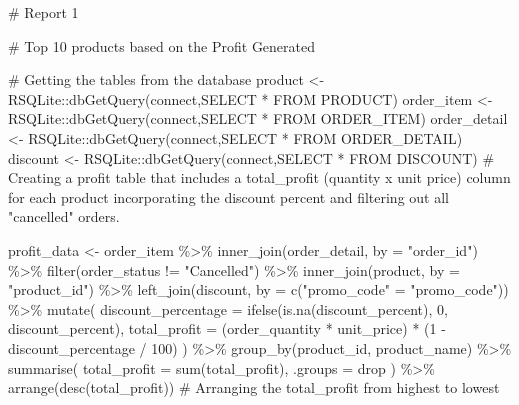\documentclass[
  letterpaper,
  DIV=11,
  numbers=noendperiod]{scrartcl}
\newenvironment{Shaded}{\begin{snugshade}}{\end{snugshade}}
\newcommand{\AttributeTok}[1]{\textcolor[rgb]{0.40,0.45,0.13}{#1}}
\newcommand{\CommentTok}[1]{\textcolor[rgb]{0.37,0.37,0.37}{#1}}
\newcommand{\DecValTok}[1]{\textcolor[rgb]{0.68,0.00,0.00}{#1}}
\newcommand{\FunctionTok}[1]{\textcolor[rgb]{0.28,0.35,0.67}{#1}}
\newcommand{\NormalTok}[1]{\textcolor[rgb]{0.00,0.23,0.31}{#1}}
\newcommand{\OtherTok}[1]{\textcolor[rgb]{0.00,0.23,0.31}{#1}}
\newcommand{\SpecialCharTok}[1]{\textcolor[rgb]{0.37,0.37,0.37}{#1}}
\newcommand{\StringTok}[1]{\textcolor[rgb]{0.13,0.47,0.30}{#1}}
\begin{document}
\begin{Shaded}
\begin{Highlighting}[]
\CommentTok{\# Report 1}

\CommentTok{\# Top 10 products based on the Profit Generated}

\CommentTok{\# Getting the tables from the database}
\NormalTok{product }\OtherTok{\textless{}{-}}\NormalTok{ RSQLite}\SpecialCharTok{::}\FunctionTok{dbGetQuery}\NormalTok{(connect,}\StringTok{\textquotesingle{}SELECT * FROM PRODUCT\textquotesingle{}}\NormalTok{)}
\NormalTok{order\_item }\OtherTok{\textless{}{-}}\NormalTok{ RSQLite}\SpecialCharTok{::}\FunctionTok{dbGetQuery}\NormalTok{(connect,}\StringTok{\textquotesingle{}SELECT * FROM ORDER\_ITEM\textquotesingle{}}\NormalTok{)}
\NormalTok{order\_detail }\OtherTok{\textless{}{-}}\NormalTok{ RSQLite}\SpecialCharTok{::}\FunctionTok{dbGetQuery}\NormalTok{(connect,}\StringTok{\textquotesingle{}SELECT * FROM ORDER\_DETAIL\textquotesingle{}}\NormalTok{)}
\NormalTok{discount }\OtherTok{\textless{}{-}}\NormalTok{ RSQLite}\SpecialCharTok{::}\FunctionTok{dbGetQuery}\NormalTok{(connect,}\StringTok{\textquotesingle{}SELECT * FROM DISCOUNT\textquotesingle{}}\NormalTok{)}
\CommentTok{\# Creating a profit table that includes a total\_profit (quantity x unit price) column for each product incorporating the discount percent and filtering out all "cancelled" orders.}

\NormalTok{profit\_data }\OtherTok{\textless{}{-}}\NormalTok{ order\_item }\SpecialCharTok{\%\textgreater{}\%}
  \FunctionTok{inner\_join}\NormalTok{(order\_detail, }\AttributeTok{by =} \StringTok{"order\_id"}\NormalTok{) }\SpecialCharTok{\%\textgreater{}\%} 
  \FunctionTok{filter}\NormalTok{(order\_status }\SpecialCharTok{!=} \StringTok{"Cancelled"}\NormalTok{) }\SpecialCharTok{\%\textgreater{}\%}
  \FunctionTok{inner\_join}\NormalTok{(product, }\AttributeTok{by =} \StringTok{"product\_id"}\NormalTok{) }\SpecialCharTok{\%\textgreater{}\%}
  \FunctionTok{left\_join}\NormalTok{(discount, }\AttributeTok{by =} \FunctionTok{c}\NormalTok{(}\StringTok{"promo\_code"} \OtherTok{=} \StringTok{"promo\_code"}\NormalTok{)) }\SpecialCharTok{\%\textgreater{}\%}
  \FunctionTok{mutate}\NormalTok{(}
    \AttributeTok{discount\_percentage =} \FunctionTok{ifelse}\NormalTok{(}\FunctionTok{is.na}\NormalTok{(discount\_percent), }\DecValTok{0}\NormalTok{, discount\_percent), }
    \AttributeTok{total\_profit =}\NormalTok{ (order\_quantity }\SpecialCharTok{*}\NormalTok{ unit\_price) }\SpecialCharTok{*}\NormalTok{ (}\DecValTok{1} \SpecialCharTok{{-}}\NormalTok{ discount\_percentage }\SpecialCharTok{/} \DecValTok{100}\NormalTok{)}
\NormalTok{  ) }\SpecialCharTok{\%\textgreater{}\%}
  \FunctionTok{group\_by}\NormalTok{(product\_id, product\_name) }\SpecialCharTok{\%\textgreater{}\%}
  \FunctionTok{summarise}\NormalTok{(}
    \AttributeTok{total\_profit =} \FunctionTok{sum}\NormalTok{(total\_profit), }
    \AttributeTok{.groups =} \StringTok{\textquotesingle{}drop\textquotesingle{}}
\NormalTok{  ) }\SpecialCharTok{\%\textgreater{}\%}
  \FunctionTok{arrange}\NormalTok{(}\FunctionTok{desc}\NormalTok{(total\_profit)) }\CommentTok{\# Arranging the total\_profit from highest to lowest}


\end{Highlighting}
\end{Shaded}
\end{document}
